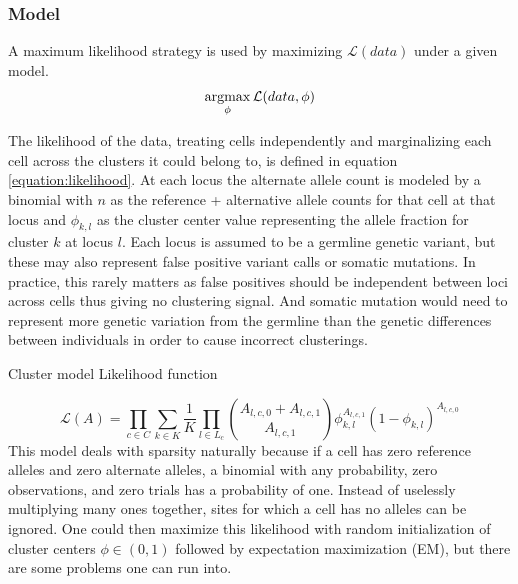 \noindent
\subsubsection{Model}

A maximum likelihood strategy is used by maximizing $\mathcal{L}(data)$ under a given model. 
\begin{equation}
\operatorname*{argmax}_{\phi} \mathcal{L}(data, \phi)
\end{equation}

The likelihood of the data, treating cells independently and marginalizing each cell across the clusters it could belong to, is defined in equation \ref{equation:likelihood}. At each locus the alternate allele count is modeled by a binomial with $n$ as the reference + alternative allele counts for that cell at that locus and $\phi_{k,l}$ as the cluster center value representing the allele fraction for cluster $k$ at locus $l$. Each locus is assumed to be a germline genetic variant, but these may also represent false positive variant calls or somatic mutations. In practice, this rarely matters as false positives should be independent between loci across cells thus giving no clustering signal. And somatic mutation would need to represent more genetic variation from the germline than the genetic differences between individuals in order to cause incorrect clusterings.

Cluster model Likelihood function

\begin{equation}\label{equation:likelihood}
\mathcal{L}(A) = \prod_{c \in C} \sum_{k \in K} \frac{1}{K} \prod_{l \in L_c} {A_{l,c,0} + A_{l,c,1}  \choose A_{l,c,1}} \phi^{A_{l,c,1}}_{k,l} (1-\phi_{k,l})^{A_{l,c,0}}
\end{equation}
This model deals with sparsity naturally because if a cell has zero reference alleles and zero alternate alleles, a binomial with any probability, zero observations, and zero trials has a probability of one. Instead of uselessly multiplying many ones together, sites for which a cell has no alleles can be ignored.
One could then maximize this likelihood with random initialization of cluster centers $\phi \in (0,1)$ followed by expectation maximization (EM), but there are some problems one can run into.

